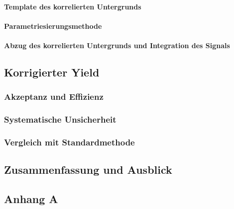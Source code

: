 \documentclass[11pt]{article}
\renewcommand{\,}{,\!} %
\begin{document}
\subsubsection{Template des korrelierten Untergrunds} \label{s3s5s2}


\subsubsection{Parametriesierungsmethode} \label{s3s5s3}


\subsubsection{Abzug des korrelierten Untergrunds und Integration des Signals} \label{s3s5s4}

\newpage
\section{Korrigierter Yield} \label{s4}

\subsection{Akzeptanz und Effizienz} \label{s4s1}


\subsection{Systematische Unsicherheit} \label{s4s2}


\subsection{Vergleich mit Standardmethode} \label{s4s3}
%

\newpage
\section{Zusammenfassung und Ausblick} \label{s5}

\newpage

\begin{appendices}
\chapter{Anhang A}

\end{appendices}

\newpage
 

\end{document}
